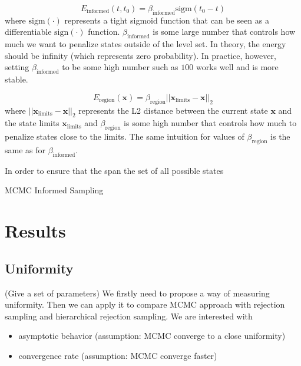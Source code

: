 \documentclass[letterpaper, 10 pt, conference]{ieeeconf}  %
\begin{document}
\begin{equation}
E_{\text{informed}}\left(t,t_0\right) = \beta_{\text{informed}} \text{sigm}\left(t_0 - t\right)
\end{equation}
where $\text{sigm}\left(\cdot\right)$ represents a tight sigmoid function that can be seen as a differentiable $\text{sign}\left(\cdot\right)$ function. $\beta_{\text{informed}}$ is some large number that controls how much we want to penalize states outside of the level set. In theory, the energy should be infinity (which represents zero probability). In practice, however, setting $\beta_{\text{informed}}$ to be some high number such as $100$ works well and is more stable.

\begin{equation}
E_{\text{region}}\left(\mathbf{x}\right) = \beta_{\text{region}}||\mathbf{x}_{\text{limits}} - \mathbf{x}||_2
\end{equation}
where $||\mathbf{x}_{\text{limits}} - \mathbf{x}||_2$ represents the L2 distance between the current state $\mathbf{x}$ and the state limits $\mathbf{x}_{\text{limits}}$ and $\beta_{\text{region}}$ is some high number that controls how much to penalize states close to the limits. The same intuition for values of $\beta_{\text{region}}$ is the same as for $\beta_{\text{informed}}$.

In order to ensure that the span the set of all possible states 

\begin{algorithm}
	\begin{algorithmic}[1]
		\STATE
   	\end{algorithmic}
	\caption{MCMC Informed Sampling}
	\label{alg:mcmc_informed_sampling}
\end{algorithm}


\section{Results}

\subsection{Uniformity}

(Give a set of parameters)
We firstly need to propose a way of measuring uniformity.
Then we can apply it to compare MCMC approach with rejection sampling and hierarchical rejection sampling.
We are interested with
\begin{itemize}
	\item asymptotic behavior (assumption: MCMC converge to a close uniformity)
	\item convergence rate (assumption: MCMC converge faster)
\end{itemize}
\end{document}
